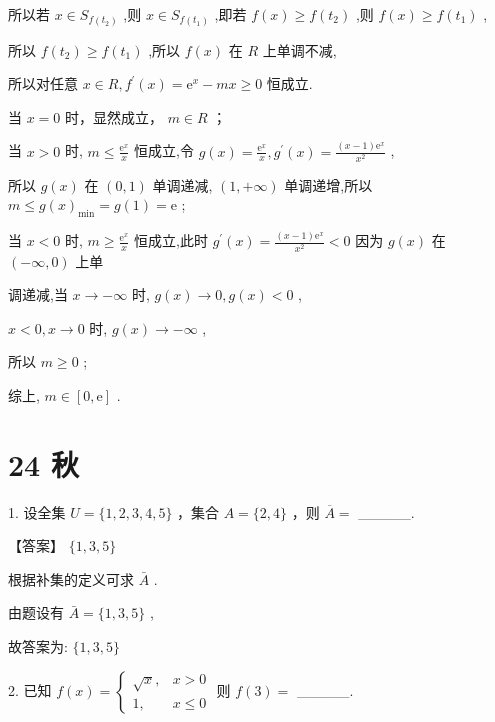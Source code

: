 \documentclass[10pt]{article}
\begin{document}
所以若 \(x \in  {S}_{f\left( {t}_{2}\right) }\) ,则 \(x \in  {S}_{f\left( {t}_{1}\right) }\) ,即若 \(f\left( x\right)  \geq  f\left( {t}_{2}\right)\) ,则 \(f\left( x\right)  \geq  f\left( {t}_{1}\right)\) ,

所以 \(f\left( {t}_{2}\right)  \geq  f\left( {t}_{1}\right)\) ,所以 \(f\left( x\right)\) 在 \(R\) 上单调不减,

所以对任意 \(x \in  R,{f}^{\prime }\left( x\right)  = {\mathrm{e}}^{x} - {mx} \geq  0\) 恒成立.

当 \(x = 0\) 时，显然成立， \(m \in  R\) ；

当 \(x > 0\) 时, \(m \leq  \frac{{\mathrm{e}}^{x}}{x}\) 恒成立,令 \(g\left( x\right)  = \frac{{\mathrm{e}}^{x}}{x},{g}^{\prime }\left( x\right)  = \frac{\left( {x - 1}\right) {\mathrm{e}}^{x}}{{x}^{2}}\) ,

所以 \(g\left( x\right)\) 在 \(\left( {0,1}\right)\) 单调递减, \(\left( {1, + \infty }\right)\) 单调递增,所以 \(m \leq  g{\left( x\right) }_{\min } = g\left( 1\right)  = \mathrm{e}\) ;

当 \(x < 0\) 时, \(m \geq  \frac{{\mathrm{e}}^{x}}{x}\) 恒成立,此时 \({g}^{\prime }\left( x\right)  = \frac{\left( {x - 1}\right) {\mathrm{e}}^{x}}{{x}^{2}} < 0\) 因为 \(g\left( x\right)\) 在 \(\left( {-\infty ,0}\right)\) 上单

调递减,当 \(x \rightarrow   - \infty\) 时, \(g\left( x\right)  \rightarrow  0,g\left( x\right)  < 0\) ,

\(x < 0,x \rightarrow  0\) 时, \(g\left( x\right)  \rightarrow   - \infty\) ,

所以 \(m \geq  0\) ;

综上, \(m \in  \left\lbrack  {0,\mathrm{e}}\right\rbrack\) .

\section*{24 秋}

1. 设全集 \(U = \{ 1,2,3,4,5\}\) ，集合 \(A = \{ 2,4\}\) ，则 \(\overline{A} =\) \_\_\_\_\_.

【答案】 \(\{ 1,3,5\}\)

根据补集的定义可求 \(\bar{A}\) .

由题设有 \(\bar{A} = \{ 1,3,5\}\) ,

故答案为: \(\{ 1,3,5\}\)

2. 已知 \(f\left( x\right)  = \left\{  \begin{array}{ll} \sqrt{x}, & x > 0 \\  1, & x \leq  0 \end{array}\right.\) 则 \(f\left( 3\right)  =\) \_\_\_\_\_.
\end{document}
